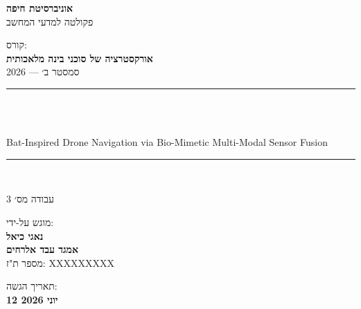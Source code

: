 \begin{titlepage}
    \centering
    \vspace*{1.5cm}

    {\large\textbf{אוניברסיטת חיפה}}\\
    \vspace{0.3em}
    {\normalsize פקולטה למדעי המחשב}\\
    \vspace{1.5cm}

    {\normalsize קורס:}\\
    \vspace{0.2em}
    {\large\textbf{אורקסטרציה של סוכני בינה מלאכותית}}\\
    \vspace{0.2em}
    {\normalsize סמסטר ב׳ --- 2026}\\
    \vspace{1.5cm}

    \rule{\linewidth}{1pt}\\
    \vspace{0.5cm}

    {\LARGE\bfseries {}}\\
    \vspace{0.4em}
    {\large\foreignlanguage{english}{Bat-Inspired Drone Navigation via Bio-Mimetic Multi-Modal Sensor Fusion}}\\
    \vspace{0.3em}

    \rule{\linewidth}{1pt}\\
    \vspace{1.5cm}

    {\large עבודה מס׳ 3}\\
    \vspace{2cm}

    {\normalsize מוגש על-ידי:}\\
    \vspace{0.5em}
    {\large\textbf{נאגי כיאל}}\\
    \vspace{0.2em}
    {\large\textbf{אמגד עבד אלרחים}}\\
    \vspace{0.2em}
    {\normalsize מספר ת"ז: XXXXXXXXX}\\
    \vspace{1cm}

    \vfill
    {\normalsize תאריך הגשה:}\\
    \vspace{0.2em}
    {\large\textbf{12 יוני 2026}}\\
    \vspace{1cm}
\end{titlepage}

